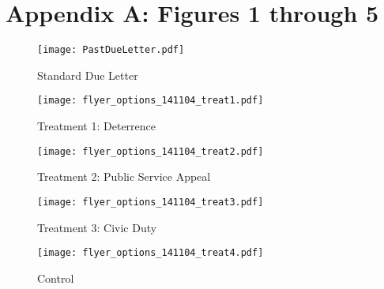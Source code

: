 \documentclass[12pt,titlepage]{article}
\begin{document}
\bigskip

\bigskip

\section*{Appendix A: Figures 1 through 5}
 \newpage
 
\begin{figure}[htpb]
\begin{center}
\caption{Standard Due Letter}
\bigskip
\texttt{[image: PastDueLetter.pdf]}
\end{center}
\end{figure}
\newpage
\begin{figure}[htpb]
\begin{center}
\caption{Treatment 1: Deterrence}
\bigskip
\texttt{[image: flyer\_options\_141104\_treat1.pdf]}
\end{center}
\end{figure}
\newpage
\begin{figure}[htpb]
\begin{center}
\caption{Treatment 2: Public Service Appeal}
\bigskip
\texttt{[image: flyer\_options\_141104\_treat2.pdf]}
\end{center}
\end{figure}
\newpage
\begin{figure}[htpb]
\begin{center}
\caption{Treatment 3: Civic Duty}
\bigskip
\texttt{[image: flyer\_options\_141104\_treat3.pdf]}
\end{center}
\end{figure}
\newpage
\begin{figure}[htpb]
\begin{center}
\caption{Control}
\bigskip
\texttt{[image: flyer\_options\_141104\_treat4.pdf]}
\end{center}
\end{figure}
\end{document}
